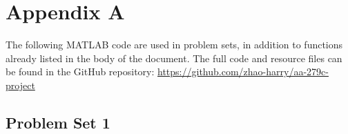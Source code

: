 \appendix

\section{Appendix A}
The following MATLAB code are used in problem sets, in addition to functions already listed in the body of the document. The full code and resource files can be found in the GitHub repository: \url{https://github.com/zhao-harry/aa-279c-project}

\subsection{Problem Set 1}
